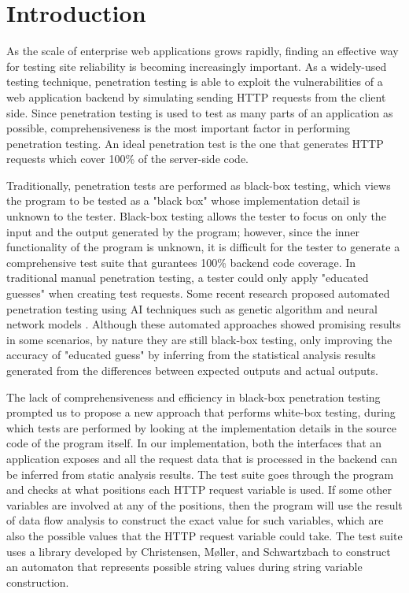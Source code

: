 \chapter{Introduction}

As the scale of enterprise web applications grows rapidly, finding an effective way for testing site reliability is becoming increasingly important. As a widely-used testing technique, penetration testing is able to exploit the vulnerabilities of a web application backend by simulating sending HTTP requests from the client side. Since penetration testing is used to test as many parts of an application as possible, comprehensiveness is the most important factor in performing penetration testing. An ideal penetration test is the one that generates HTTP requests which cover 100\% of the server-side code.

Traditionally, penetration tests are performed as black-box testing, which views the program to be tested as a "black box" whose implementation detail is unknown to the tester. Black-box testing allows the tester to focus on only the input and the output generated by the program; however, since the inner functionality of the program is unknown, it is difficult for the tester to generate a comprehensive test suite that gurantees 100\% backend code coverage. In traditional manual penetration testing, a tester could only apply "educated guesses" when creating test requests. Some recent research proposed automated penetration testing using AI techniques such as genetic algorithm \cite{ref1} and neural network models \cite{ref2}. Although these automated approaches showed promising results in some scenarios, by nature they are still black-box testing, only improving the accuracy of "educated guess" by inferring from the statistical analysis results generated from the differences between expected outputs and actual outputs.

The lack of comprehensiveness and efficiency in black-box penetration testing prompted us to propose a new approach that performs white-box testing, during which tests are performed by looking at the implementation details in the source code of the program itself. In our implementation, both the interfaces that an application exposes and all the request data that is processed in the backend can be inferred from static analysis results. The test suite goes through the program and checks at what positions each HTTP request variable is used. If some other variables are involved at any of the positions, then the program will use the result of data flow analysis to construct the exact value for such variables, which are also the possible values that the HTTP request variable could take. The test suite uses a library developed by Christensen, Møller, and Schwartzbach \cite{ref4} to construct an automaton that represents possible string values during string variable construction.

